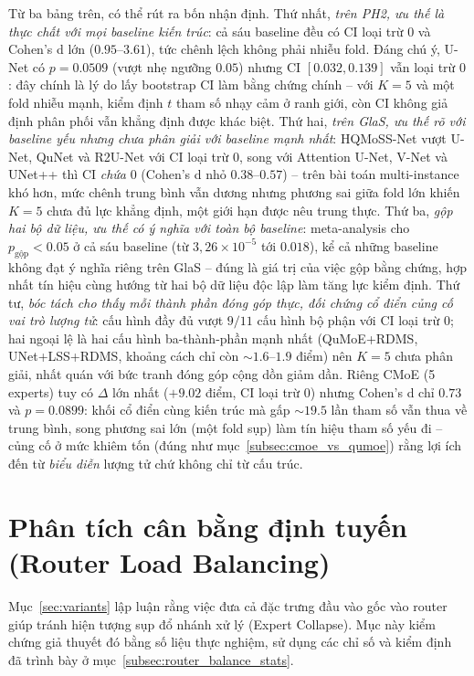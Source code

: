 Từ ba bảng trên, có thể rút ra bốn nhận định. Thứ nhất, \emph{trên PH2, ưu thế là thực chất với mọi baseline kiến trúc}: cả sáu baseline đều có CI loại trừ $0$ và Cohen's d lớn ($0.95$--$3.61$), tức chênh lệch không phải nhiễu fold. Đáng chú ý, U-Net có $p = 0.0509$ (vượt nhẹ ngưỡng $0.05$) nhưng CI $[0.032, 0.139]$ vẫn loại trừ $0$: đây chính là lý do lấy bootstrap CI làm bằng chứng chính -- với $K=5$ và một fold nhiễu mạnh, kiểm định $t$ tham số nhạy cảm ở ranh giới, còn CI không giả định phân phối vẫn khẳng định được khác biệt. Thứ hai, \emph{trên GlaS, ưu thế rõ với baseline yếu nhưng chưa phân giải với baseline mạnh nhất}: HQMoSS-Net vượt U-Net, QuNet và R2U-Net với CI loại trừ $0$, song với Attention U-Net, V-Net và UNet++ thì CI \emph{chứa} $0$ (Cohen's d nhỏ $0.38$--$0.57$) -- trên bài toán multi-instance khó hơn, mức chênh trung bình vẫn dương nhưng phương sai giữa fold lớn khiến $K=5$ chưa đủ lực khẳng định, một giới hạn được nêu trung thực. Thứ ba, \emph{gộp hai bộ dữ liệu, ưu thế có ý nghĩa với toàn bộ baseline}: meta-analysis cho $p_{\text{gộp}} < 0.05$ ở cả sáu baseline (từ $3{,}26\times 10^{-5}$ tới $0.018$), kể cả những baseline không đạt ý nghĩa riêng trên GlaS -- đúng là giá trị của việc gộp bằng chứng, hợp nhất tín hiệu cùng hướng từ hai bộ dữ liệu độc lập làm tăng lực kiểm định. Thứ tư, \emph{bóc tách cho thấy mỗi thành phần đóng góp thực, đối chứng cổ điển củng cố vai trò lượng tử}: cấu hình đầy đủ vượt $9/11$ cấu hình bộ phận với CI loại trừ $0$; hai ngoại lệ là hai cấu hình ba-thành-phần mạnh nhất (QuMoE+RDMS, UNet+LSS+RDMS, khoảng cách chỉ còn $\sim\!1.6$--$1.9$ điểm) nên $K=5$ chưa phân giải, nhất quán với bức tranh đóng góp cộng dồn giảm dần. Riêng CMoE (5 experts) tuy có $\Delta$ lớn nhất ($+9.02$ điểm, CI loại trừ $0$) nhưng Cohen's d chỉ $0.73$ và $p = 0.0899$: khối cổ điển cùng kiến trúc mà gấp $\sim\!19.5$ lần tham số vẫn thua về trung bình, song phương sai lớn (một fold sụp) làm tín hiệu tham số yếu đi -- củng cố ở mức khiêm tốn (đúng như mục~\ref{subsec:cmoe_vs_qumoe}) rằng lợi ích đến từ \emph{biểu diễn} lượng tử chứ không chỉ từ cấu trúc.

\FloatBarrier

\section{Phân tích cân bằng định tuyến (Router Load Balancing)}
\label{sec:router_balance}
Mục~\ref{sec:variants} lập luận rằng việc đưa cả đặc trưng đầu vào gốc vào router giúp tránh hiện tượng sụp đổ nhánh xử lý (Expert Collapse). Mục này kiểm chứng giả thuyết đó bằng số liệu thực nghiệm, sử dụng các chỉ số và kiểm định đã trình bày ở mục~\ref{subsec:router_balance_stats}.

